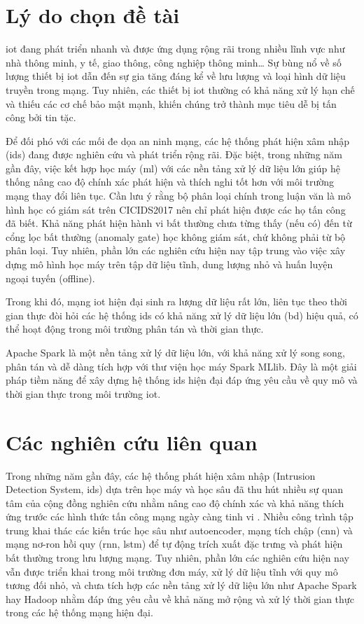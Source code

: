 \section{Lý do chọn đề tài}

\ac{iot} đang phát triển nhanh và được ứng dụng rộng rãi trong nhiều lĩnh vực như nhà thông minh, y tế, giao thông, công nghiệp thông minh\ldots{} Sự bùng nổ về số lượng thiết bị \ac{iot} dẫn đến sự gia tăng đáng kể về lưu lượng và loại hình dữ liệu truyền trong mạng. Tuy nhiên, các thiết bị \ac{iot} thường có khả năng xử lý hạn chế và thiếu các cơ chế bảo mật mạnh, khiến chúng trở thành mục tiêu dễ bị tấn công bởi tin tặc.

Để đối phó với các mối đe dọa an ninh mạng, các hệ thống phát hiện xâm nhập
(\ac{ids}) đang được nghiên cứu và phát triển rộng rãi. Đặc biệt, trong những năm gần đây, việc kết hợp học máy (\ac{ml}) với các nền tảng xử lý dữ liệu lớn giúp hệ thống nâng cao độ chính xác phát hiện và thích nghi tốt hơn với môi trường mạng thay đổi liên tục. Cần lưu ý rằng bộ phân loại chính trong luận văn là mô hình học có giám sát trên CICIDS2017 nên chỉ phát hiện được các họ tấn công đã biết. Khả năng phát hiện hành vi bất thường chưa từng thấy (nếu có) đến từ cổng lọc bất thường (anomaly gate) học không giám sát, chứ không phải từ bộ phân loại.
Tuy nhiên, phần lớn các nghiên cứu hiện nay tập trung vào việc xây dựng mô
hình học máy trên tập dữ liệu tĩnh, dung lượng nhỏ và huấn luyện ngoại tuyến (offline).

Trong khi đó, mạng \ac{iot} hiện đại sinh ra lượng dữ liệu rất lớn, liên tục theo thời gian thực đòi hỏi các hệ thống \ac{ids} có khả năng xử lý dữ liệu lớn (\ac{bd}) hiệu quả, có thể hoạt động trong môi trường phân tán và thời gian thực.

Apache Spark là một nền tảng xử lý dữ liệu lớn, với khả năng xử lý
song song, phân tán và dễ dàng tích hợp với thư viện học máy Spark MLlib. Đây là một giải pháp tiềm năng để xây dựng hệ thống \ac{ids} hiện đại đáp ứng yêu cầu về quy mô và thời gian thực trong môi trường \ac{iot}.

\section{Các nghiên cứu liên quan}

Trong những năm gần đây, các hệ thống phát hiện xâm nhập (Intrusion Detection System, \ac{ids}) dựa trên học máy và học sâu đã thu hút nhiều sự quan tâm của cộng đồng nghiên cứu nhằm nâng cao độ chính xác và khả năng thích ứng trước các hình thức tấn công mạng ngày càng tinh vi \cite{khraisat2019survey,ferrag2020deep,vinayakumar2019deep}. Nhiều công trình tập trung khai thác các kiến trúc học sâu như autoencoder, mạng tích chập (\ac{cnn}) và mạng nơ-ron hồi quy (\ac{rnn}, \ac{lstm}) để tự động trích xuất đặc trưng và phát hiện bất thường trong lưu lượng mạng. Tuy nhiên, phần lớn các nghiên cứu hiện nay vẫn được triển khai trong môi trường đơn máy, xử lý dữ liệu tĩnh với quy mô tương đối nhỏ, và chưa tích hợp các nền tảng xử lý dữ liệu lớn như Apache Spark hay Hadoop nhằm đáp ứng yêu cầu về khả năng mở rộng và xử lý thời gian thực trong các hệ thống mạng hiện đại.

